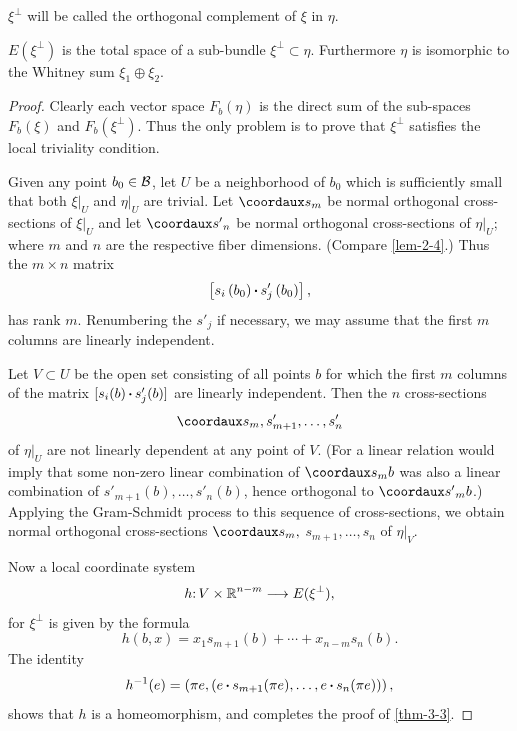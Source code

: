 \begin{definition}\label{def:3-3}
	$\xi^\perp$ will be called the orthogonal complement of $\xi$ in $\eta$.
\end{definition}

\begin{theorem}\label{thm-3-3}
	$E(\xi^\perp)$ is the total space of a sub-bundle
	$\xi^\perp\subset\eta$. Furthermore $\eta$ is isomorphic to the Whitney sum $\xi_1\oplus\xi_2$.
\end{theorem}
\begin{proof}
	Clearly each vector space $F_b(\eta)$ is the direct sum of the sub-spaces $F_b(\xi)$ and $F_b(\xi^\perp)$. Thus the only problem is to prove that $\xi^\perp$
	satisfies the local triviality condition.
	
	Given any point $b_0\in \mathcal{B}$, let $U$ be a neighborhood of $b_0$ which is
	sufficiently small that both $\xi|_U$ and $\eta|_U$ are trivial. Let $\coord{s_m}$
	be normal orthogonal cross-sections of $\xi|_U$ and let $\coord{{s'}_n}$ be
	normal orthogonal cross-sections of $\eta|_U$; where $m$ and $n$ are the 
	respective fiber dimensions. (Compare \cref{lem-2-4}.) Thus the $m\times n$ matrix 
	\[\left[s_{i}\left(b_{0}\right) \operatorname{\boldsymbol{\cdot}} s_{j}^{\prime}\left(b_{0}\right)\right], \]
	has rank $m$. Renumbering the $s'_j$ if necessary, we may assume that the
	first $m$ columns are linearly independent.
	
	Let $V\subset U$ be the open set consisting of all points $b$ for which the
	first $m$ columns of the matrix $[s_{i}(b) \operatorname{\boldsymbol{\cdot}} s_{j}^{\prime}(b)]$  are linearly independent.
	Then the $n$ cross-sections
	\[\coord{s_m},s'_{m+1},\dots,s'_n \] 
	of $\eta|_U$ are not linearly dependent at any point of $V$. (For a linear 
	relation would imply that some non-zero linear combination of $\coord{s_mb}$
	was also a linear combination of $s'_{m+1}(b),\dots,s'_n(b)$, hence orthogonal to
	$\coord{{s'}_mb}$.) Applying the Gram-Schmidt process to this sequence of
	cross-sections, we obtain normal orthogonal cross-sections $\coord{s_m},$ $s_{m+1},\dots,s_n$ of $\eta|_V$.
	
	Now a local coordinate system
	\[h\mathpunct{:}V\times\boldsymbol{\mathbb{R}}^{n-m}\longrightarrow E(\xi^\perp), \]
	for $\xi^\perp$ is given by the formula
	\[h(b, x)=x_{1} s_{m+1}(b)+\cdots+x_{n-m} s_{n}(b).\]
	The identity
	\[h^{-1}(e)=\left(\pi e,\left(e \operatorname{\boldsymbol{\cdot}} s_{m+1}(\pi e), \ldots, e \operatorname{\boldsymbol{\cdot}} s_{n}(\pi e)\right)\right),\]
shows that $h$ is a homeomorphism, and completes the proof of \ref{thm-3-3}.
\end{proof}

